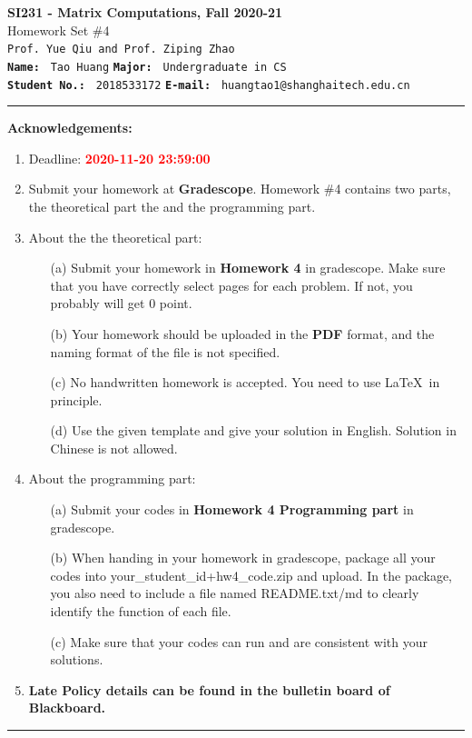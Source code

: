 \documentclass[english,onecolumn]{IEEEtran}
\begin{document}
\begin{center}
	\textbf{\LARGE{SI231 - Matrix Computations, Fall 2020-21}}\\
	{\Large Homework Set \#4}\\
	\texttt{Prof. Yue Qiu and Prof. Ziping Zhao}\\
	\texttt{\textbf{Name:}}   	\texttt{ Tao Huang}  		\hspace{1bp}
	\texttt{\textbf{Major:}}  	\texttt{ Undergraduate in CS } 	\\
	\texttt{\textbf{Student No.:}} 	\texttt{ 2018533172}     \hspace{1bp}
	\texttt{\textbf{E-mail:}} 	\texttt{ huangtao1@shanghaitech.edu.cn}
\par\end{center}

\noindent
\rule{\linewidth}{0.4pt}
{\bf {\large Acknowledgements:}}
\begin{enumerate}
    \item Deadline: \textcolor{red}{\textbf{2020-11-20 23:59:00}}
    \item Submit your homework at \textbf{Gradescope}.
    Homework \#4 contains two parts, the theoretical part the and the programming part.
    \item About the the theoretical part:
    \begin{enumerate}
            \item[(a)] Submit your homework in \textbf{Homework 4} in gradescope. Make sure that you have correctly select pages for each problem. If not, you probably will get 0 point.
            \item[(b)] Your homework should be uploaded in the \textbf{PDF} format, and the naming format of the file is not specified.
            \item[(c)] No handwritten homework is accepted. You need to use \LaTeX $\,$ in principle.
            \item[(d)] Use the given template and give your solution in English. Solution in Chinese is not allowed. 
        \end{enumerate}
  \item About the programming part:
  \begin{enumerate}
      \item[(a)] Submit your codes in \textbf{Homework 4 Programming part} in gradescope. 
      \item[(b)] When handing in your homework in gradescope, package all your codes into {\sf your\_student\_id+hw4\_code.zip} and upload. In the package, you also need to include a file named {\sf README.txt/md} to clearly identify the function of each file.
     \item[(c)] Make sure that your codes can run and are consistent with your solutions.
  \end{enumerate}
  \item \textbf{Late Policy details can be found in the bulletin board of Blackboard.}
\end{enumerate}
\rule{\linewidth}{0.4pt}
\end{document}

